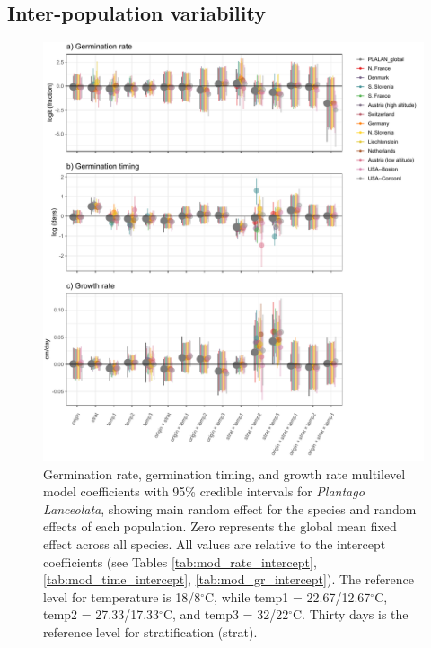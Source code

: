 \documentclass[12pt]{article}\usepackage[]{graphicx}\usepackage[]{color}
\begin{document}
\subsection{Inter-population variability}
\pagebreak
\begin{figure}[H]
\centering
\includegraphics[scale=1]{PLALAN_pops_plot.pdf}
\caption{Germination rate, germination timing, and growth rate multilevel model coefficients with 95\% credible intervals for \textit{Plantago Lanceolata}, showing main random effect for the species and random effects of each population. Zero represents the global mean fixed effect across all species. All values are relative to the intercept coefficients (see Tables \ref{tab:mod_rate_intercept}, \ref{tab:mod_time_intercept}, \ref{tab:mod_gr_intercept}). The reference level for temperature is 18/8$^\circ$C, while temp1 = 22.67/12.67$^\circ$C, temp2 = 27.33/17.33$^\circ$C, and temp3 = 32/22$^\circ$C. Thirty days is the reference level for stratification (strat).}
\label{fig:pops}
\end{figure}
\end{document}
